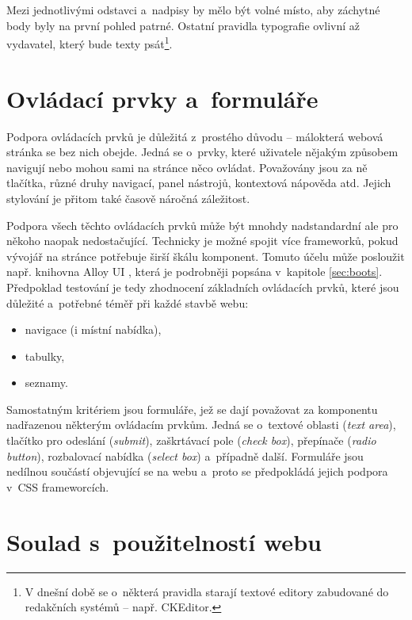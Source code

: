 \documentclass[thesis=B,czech]{FITthesis}[2012/06/26]
\begin{document}
Mezi jednotlivými odstavci a~nadpisy by mělo být volné místo, aby záchytné body byly na první pohled patrné. Ostatní pravidla typografie ovlivní až vydavatel, který bude texty psát\footnote{V dnešní době se o~některá pravidla starají textové editory zabudované do redakčních systémů -- např. CKEditor.}. 



\section{Ovládací prvky a~formuláře}



Podpora ovládacích prvků je důležitá z~prostého důvodu -- málokterá webová stránka se bez nich obejde. Jedná se o~prvky, které uživatele nějakým způsobem navigují nebo mohou sami na stránce něco ovládat. Považovány jsou za ně tlačítka, různé druhy navigací, panel nástrojů, kontextová nápověda atd. Jejich stylování je přitom také časově náročná záležitost.  

Podpora všech těchto ovládacích prvků může být mnohdy nadstandardní ale pro někoho naopak nedostačující. Technicky je možné spojit více frameworků, pokud vývojář na stránce potřebuje širší škálu komponent. Tomuto účelu může posloužit např. knihovna Alloy UI , která je podrobněji popsána v~kapitole \ref{sec:boots}. Předpoklad testování je tedy zhodnocení základních ovládacích prvků, které jsou důležité a~potřebné téměř při každé stavbě webu:

\begin{itemize}
 \item navigace (i místní nabídka),
 \item tabulky,
 \item seznamy.
\end{itemize}

Samostatným kritériem jsou formuláře, jež se dají považovat za komponentu nadřazenou některým ovládacím prvkům. Jedná se o~textové oblasti (\textit{text area}), tlačítko pro odeslání (\textit{submit}), zaškrtávací pole (\textit{check box}), přepínače (\textit{radio button}), rozbalovací nabídka (\textit{select box}) a~případně další. Formuláře jsou nedílnou součástí objevující se na webu a~proto se předpokládá jejich podpora v~\gls{CSS} frameworcích.

\section{Soulad s~použitelností webu}
\label{sec:wcag}
\end{document}
